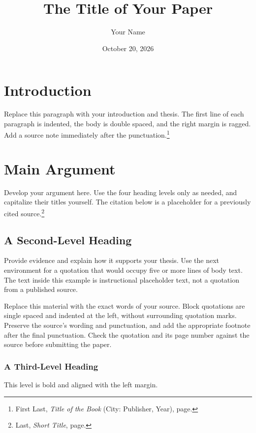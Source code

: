 \documentclass[font=termes]{mbts}
\title{The Title of Your Paper}
\author{Your Name}
\date{October 20, 2026}
\begin{document}
\maketitle


\section{Introduction}
Replace this paragraph with your introduction and thesis. The first line of each
paragraph is indented, the body is double spaced, and the right margin is ragged.
Add a source note immediately after the punctuation.\footnote{First Last,
\textit{Title of the Book} (City: Publisher, Year), page.}

\section{Main Argument}
Develop your argument here. Use the four heading levels only as needed, and
capitalize their titles yourself. The citation below is a placeholder for a
previously cited source.\footnote{Last, \textit{Short Title}, page.}

\subsection{A Second-Level Heading}
Provide evidence and explain how it supports your thesis. Use the next
environment for a quotation that would occupy five or more lines of body text.
The text inside this example is instructional placeholder text, not a quotation
from a published source.

\begin{mbtsquote}
Replace this material with the exact words of your source. Block quotations
are single spaced and indented at the left, without surrounding quotation
marks. Preserve the source's wording and punctuation, and add the appropriate
footnote after the final punctuation. Check the quotation and its page number
against the source before submitting the paper.
\end{mbtsquote}

\subsubsection{A Third-Level Heading}
This level is bold and aligned with the left margin.
\end{document}
